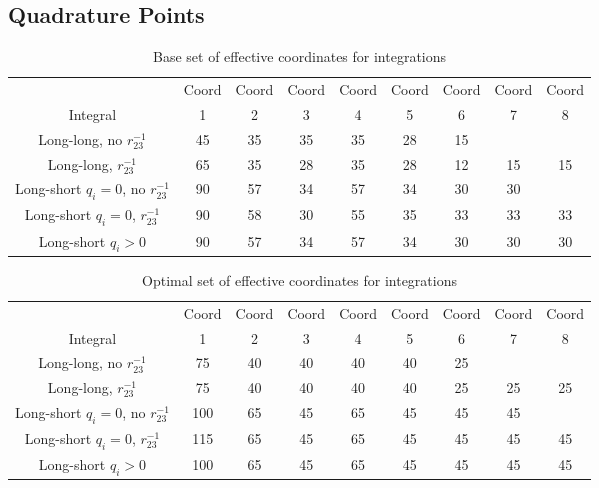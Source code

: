 \documentclass[Dissertation.tex]{subfiles}
\begin{document}
\subsection{Quadrature Points}
\label{sec:QuadraturePoints}


\begin{table}[H]
\centering
\footnotesize
\begin{tabular}{c c c c c c c c c}
\toprule
 & Coord & Coord & Coord & Coord & Coord & Coord & Coord & Coord\\
Integral & 1 & 2 & 3 & 4 & 5 & 6 & 7 & 8 \\
\midrule
 Long-long, no $r_{23}^{-1}$ & 45 & 35 & 35 & 35 & 28 & 15 & & \\
 Long-long, $r_{23}^{-1}$ & 65 & 35 & 28 & 35 & 28 & 12 & 15 & 15 \\
\midrule
 Long-short $q_i = 0$, no $r_{23}^{-1}$ & 90 & 57 & 34 & 57 & 34 & 30 & 30 & \\
 Long-short $q_i = 0$, $r_{23}^{-1}$ & 90 & 58 & 30 & 55 & 35 & 33 & 33 & 33 \\
 Long-short $q_i > 0$ & 90 & 57 & 34 & 57 & 34 & 30 & 30 & 30 \\
\bottomrule
\end{tabular}
\caption{Base set of effective coordinates for integrations}
\label{tab:BaseEffectiveCoords}
\end{table}

\begin{table}[H]
\centering
\footnotesize
\begin{tabular}{c c c c c c c c c}
\toprule
 & Coord & Coord & Coord & Coord & Coord & Coord & Coord & Coord\\
Integral & 1 & 2 & 3 & 4 & 5 & 6 & 7 & 8 \\
\midrule
 Long-long, no $r_{23}^{-1}$			&  75 & 40 & 40 & 40 & 40 & 25 & & \\
 Long-long, $r_{23}^{-1}$				&  75 & 40 & 40 & 40 & 40 & 25 & 25 & 25 \\
\midrule
 Long-short $q_i = 0$, no $r_{23}^{-1}$	& 100 & 65 & 45 & 65 & 45 & 45 & 45 & \\
 Long-short $q_i = 0$, $r_{23}^{-1}$	& 115 & 65 & 45 & 65 & 45 & 45 & 45 & 45 \\
 Long-short $q_i > 0$					& 100 & 65 & 45 & 65 & 45 & 45 & 45 & 45 \\
\bottomrule
\end{tabular}
\caption{Optimal set of effective coordinates for integrations}
\label{tab:OptimalEffectiveCoords}
\end{table}
\end{document}
